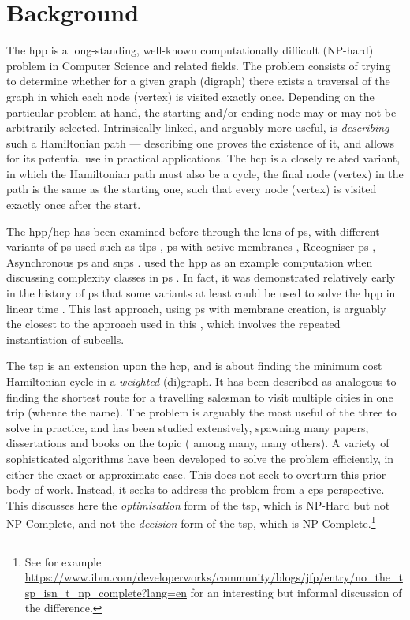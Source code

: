 \section{Background}

The \gls{hpp} is a long-standing, well-known computationally difficult (NP-hard) problem in Computer Science and related fields.  The problem consists of trying to determine whether for a given graph (digraph) there exists a traversal of the graph in which each node (vertex) is visited exactly once.  Depending on the particular problem at hand, the starting and/or ending node may or may not be arbitrarily selected.  Intrinsically linked, and arguably more useful, is \emph{describing} such a Hamiltonian path --- describing one proves the existence of it, and allows for its potential use in practical applications.  The \gls{hcp} is a closely related variant, in which the Hamiltonian path must also be a cycle, \ie{} the final node (vertex) in the path is the same as the starting one, such that every node (vertex) is visited exactly once after the start.

The \gls{hpp}/\gls{hcp} has been examined before through the lens of \gls{ps}, with different variants of \gls{ps} used such as \gls{tlps} \cite{Martin-Vide2003}, \gls{ps} with active membranes \cite{Pan2006,Song2013}, Recogniser \gls{ps} \cite{Chen2009}, Asynchronous \gls{ps} \cite{Tagawa2012} and \gls{snps} \cite{Xue2013}.  \citeauthor{Jimenez2003} used the \gls{hpp} as an example computation when discussing complexity classes in \gls{ps} \cite{Jimenez2003}.  In fact, it was demonstrated relatively early in the history of \gls{ps} that some variants at least could be used to solve the \gls{hpp} in linear time \cite{Mutyam2001}.  This last approach, using \gls{ps} with membrane creation, is arguably the closest to the approach used in this , which involves the repeated instantiation of subcells.

The \gls{tsp} is an extension upon the \gls{hcp}, and is about finding the minimum cost Hamiltonian cycle in a \emph{weighted} (di)graph.  It has been described as analogous to finding the shortest route for a travelling salesman to visit multiple cities in one trip (whence the name).  The problem is arguably the most useful of the three to solve in practice, and has been studied extensively, spawning many papers, dissertations and books on the topic (\eg{} \cite{Smith2017,Ezugwu2017,Cook2012,Applegate2006} among many, many others).  A variety of sophisticated algorithms have been developed to solve the problem efficiently, in either the exact or approximate case.  This  does not seek to overturn this prior body of work.  Instead, it seeks to address the problem from a \gls{cps} perspective.  This  discusses here the \emph{optimisation} form of the \gls{tsp}, which is NP-Hard but not NP-Complete, and not the \emph{decision} form of the \gls{tsp}, which is NP-Complete.\footnote{See for example \url{https://www.ibm.com/developerworks/community/blogs/jfp/entry/no_the_tsp_isn_t_np_complete?lang=en} for an interesting but informal discussion of the difference.}

